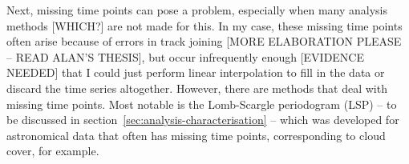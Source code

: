Next, missing time points can pose a problem, especially when many analysis methods [WHICH?] are not made for this.
In my case, these missing time points often arise because of errors in track joining [MORE ELABORATION PLEASE -- READ ALAN'S THESIS], but occur infrequently enough [EVIDENCE NEEDED] that I could just perform linear interpolation to fill in the data or discard the time series altogether.
However, there are methods that deal with missing time points.
Most notable is the Lomb-Scargle periodogram (LSP) -- to be discussed in section~\ref{sec:analysis-characterisation} -- which was developed for astronomical data that often has missing time points, corresponding to cloud cover, for example.

